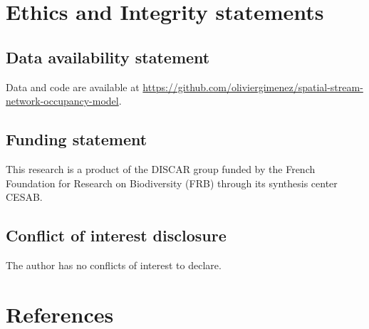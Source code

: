 \documentclass[
  11pt,
  a4paper,
]{article}
\begin{document}
\section{Ethics and Integrity statements}\label{ethics-and-integrity-statements}

\subsection{Data availability statement}\label{data-availability-statement}

Data and code are available at \href{https://github.com/oliviergimenez/spatial-stream-network-occupancy-model}{https://github.com/oliviergimenez/spatial-stream-network-occupancy-model}.

\subsection{Funding statement}\label{funding-statement}

This research is a product of the DISCAR group funded by the French Foundation for Research on Biodiversity (FRB) through its synthesis center CESAB.

\subsection{Conflict of interest disclosure}\label{conflict-of-interest-disclosure}

The author has no conflicts of interest to declare.

\section{References}\label{references}
\end{document}
